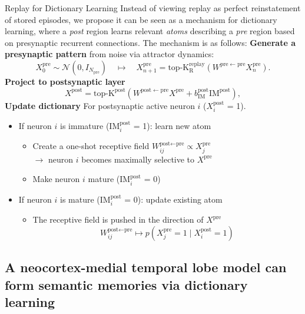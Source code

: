\documentclass{article}
\begin{document}
\begin{technicalbox}{Replay for Dictionary Learning}
Instead of viewing replay as perfect reinstatement of stored episodes, we propose it can be seen as a mechanism for dictionary learning, where a \textit{post} region learns relevant \textit{atoms} describing a \textit{pre} region based on presynaptic recurrent connections. The mechanism is as follows:
\newline\newline
\textbf{Generate a presynaptic pattern} from noise via attractor dynamics:
\[
X^\mathrm{pre}_{0} \sim \mathcal{N}(0,I_{N_\mathrm{pre}})
\quad \longmapsto \quad
X^\mathrm{pre}_{n+1}
=
\operatorname{top\text{-}K_R^{\mathrm{replay}}}
\left(
W^{\mathrm{pre}\leftarrow \mathrm{pre}} X^\mathrm{pre}_{n}
\right).
\]
\textbf{Project to postsynaptic layer}
\[
X^\mathrm{post}
=
\operatorname{top\text{-}K^\textrm{post}}
\left(
W^{\mathrm{post}\leftarrow\mathrm{pre}}X^\mathrm{pre}
+
b_\mathrm{IM}^\textrm{post}\mathrm{IM^\textrm{post}}
\right),
\]
\textbf{Update dictionary} For postsynaptic active neuron $i$ ($X^\mathrm{post}_i$ = 1).
\begin{itemize}
    \item If neuron $i$ is immature ($\textrm{IM}^\textrm{post}_i$ = 1): learn new atom
    \begin{itemize}
        \item Create a one-shot receptive field $W_{ij}^{\textrm{post}\leftarrow\textrm{pre}} \propto X^\textrm{pre}_j$ \\  
        $\longrightarrow$ neuron $i$ becomes maximally selective to $X^\textrm{pre}$
        \item Make neuron $i$ mature ($\textrm{IM}^\textrm{post}_i$ = 0)
    \end{itemize}
    \item If neuron $i$ is mature  ($\textrm{IM}^\textrm{post}_i$ = 0): update existing atom
    \begin{itemize}
        \item The receptive field is pushed in the direction of $X^\textrm{pre}$
        \[W_{ij}^{\textrm{post}\leftarrow\textrm{pre}} \longmapsto
p(X^\mathrm{pre}_j=1 \mid X^\mathrm{post}_i=1)\]
    \end{itemize}
\end{itemize}
\end{technicalbox}
\subsection*{A neocortex-medial temporal lobe model can form semantic memories via dictionary learning}
\end{document}
